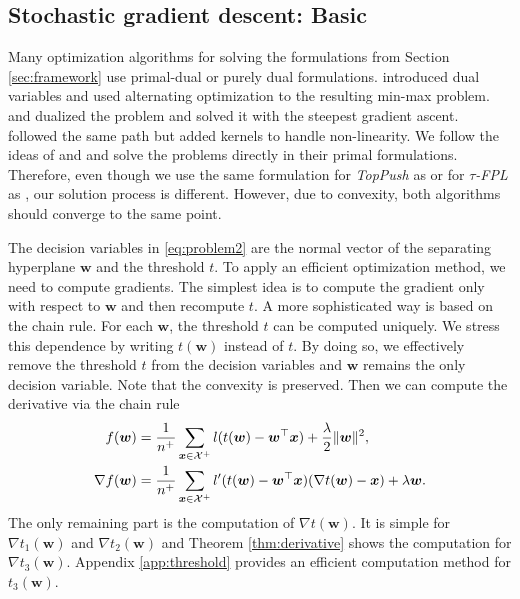 \documentclass[]{interact}
\theoremstyle{plain}%
\theoremstyle{definition}
\theoremstyle{remark}
\newcommand{\norm}[1]{\|#1\|}
\newcommand{\toppush}{\emph{TopPush}\xspace}
\newcommand{\npC}{{\emph{$\tau$-FPL}}\xspace}
\newcommand{\Xcal}{\mathcal{X}}
\begin{document}
\subsection{Stochastic gradient descent: Basic}

Many optimization algorithms for solving the formulations from Section \ref{sec:framework} use primal-dual or purely dual formulations. \cite{Eban_2017} introduced dual variables and used alternating optimization to the resulting min-max problem.  \cite{Li_TopPush} and \cite{zhang2018tau} dualized the problem and solved it with the steepest gradient ascent. \cite{macha2020nonlinear} followed the same path but added kernels to handle non-linearity. We follow the ideas of \cite{mackey2018constrained} and \cite{adam2019machine} and solve the problems directly in their primal formulations. Therefore, even though we use the same formulation for \toppush as \cite{Li_TopPush} or for \npC as \cite{zhang2018tau}, our solution process is different. However, due to convexity, both algorithms should converge to the same point.

The decision variables in \eqref{eq:problem2} are the normal vector of the separating hyperplane $\bm w$ and the threshold $t$. To apply an efficient optimization method, we need to compute gradients. The simplest idea \cite{Grill_2016} is to compute the gradient only with respect to $\bm w$ and then recompute $t$. A more sophisticated way is based on the chain rule. For each $\bm w$, the threshold $t$ can be computed uniquely. We stress this dependence by writing $t(\bm w)$ instead of $t$. By doing so, we effectively remove the threshold $t$ from the decision variables and $\bm w$ remains the only decision variable. Note that the convexity is preserved. Then we can compute the derivative via the chain rule
\begin{equation}\label{eq:derivatives}
\aligned
f(\bm w) &= \frac{1}{n^+}\sum_{\bm x\in\Xcal^+} l(t(\bm w) - \bm w^\top \bm x) + \frac{\lambda}{2}\norm{\bm w}^2, \\
\nabla f(\bm w) &= \frac{1}{n^+}\sum_{\bm x\in\Xcal^+} l'(t(\bm w) - \bm w^\top \bm x)(\nabla t(\bm w) - \bm x) + \lambda \bm w.
\endaligned
\end{equation}
The only remaining part is the computation of $\nabla t(\bm w)$. It is simple for $\nabla t_1(\bm w)$ and $\nabla t_2(\bm w)$ and Theorem \ref{thm:derivative} shows the computation for $\nabla t_3(\bm w)$. Appendix \ref{app:threshold} provides an efficient computation method for $t_3(\bm w)$.
\end{document}
